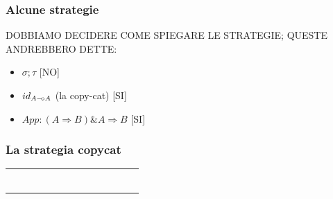 \documentclass{beamer}
\newcommand{\limp}{\mathbin{{-}\mkern-3.5mu{\circ}}}
\begin{document}
\begin{frame}[t]
	
	{
	\centering
	\huge
	
	
	}
	
	
\end{frame}




\begin{frame}

	\frametitle{Alcune strategie}
	
	DOBBIAMO DECIDERE COME SPIEGARE LE STRATEGIE; QUESTE ANDREBBERO DETTE:
	\begin{itemize}
		\item $\sigma ; \tau$ [NO]
		\item $id_{A\limp A}$ (la copy-cat) [SI]
		\item $App:(A \Rightarrow B)\& A \Rightarrow B$ [SI]
	\end{itemize}

\end{frame}



\begin{frame}[t]
	
	\frametitle{La strategia copycat}
	
	\begin{tabular}{c c}
		
		
		&
		
		\\
		
		\begin{minipage}{0.48\textwidth}
			\begin{figure}[t]
				\Large
				\centering
				\def\svgwidth{0.6\textwidth}
				
			\end{figure}
		\end{minipage} &  \begin{minipage}{0.48\textwidth}
			\begin{figure}[t]
				\Large
				\centering
				\def\svgwidth{0.6\textwidth}
				
			\end{figure}
		\end{minipage} \\
		
		
		&
		
		
	\end{tabular}
	

	
\end{frame}
\end{document}
